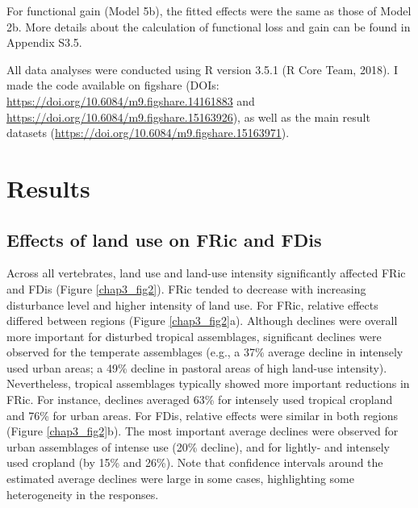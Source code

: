 For functional gain (Model 5b), the fitted effects were the same as those of Model 2b. More details about the calculation of functional loss and gain can be found in Appendix S3.5.

All data analyses were conducted using R version 3.5.1 (R Core Team, 2018). I made the code available on figshare (DOIs: \url{https://doi.org/10.6084/m9.figshare.14161883} and \url{https://doi.org/10.6084/m9.figshare.15163926}), as well as the main result datasets (\url{https://doi.org/10.6084/m9.figshare.15163971}).

\section{Results}

\subsection{Effects of land use on FRic and FDis}

Across all vertebrates, land use and land-use intensity significantly affected FRic and FDis (Figure \ref{chap3_fig2}). FRic tended to decrease with increasing disturbance level and higher intensity of land use. For FRic, relative effects differed between regions (Figure \ref{chap3_fig2}a). Although declines were overall more important for disturbed tropical assemblages, significant declines were observed for the temperate assemblages (e.g., a 37\% average decline in intensely used urban areas; a 49\% decline in pastoral areas of high land-use intensity). Nevertheless, tropical assemblages typically showed more important reductions in FRic. For instance, declines averaged 63\% for intensely used tropical cropland and 76\% for urban areas. For FDis, relative effects were similar in both regions (Figure \ref{chap3_fig2}b). The most important average declines were observed for urban assemblages of intense use (20\% decline), and for lightly- and intensely used cropland (by 15\% and 26\%). Note that confidence intervals around the estimated average declines were large in some cases, highlighting some heterogeneity in the responses.

